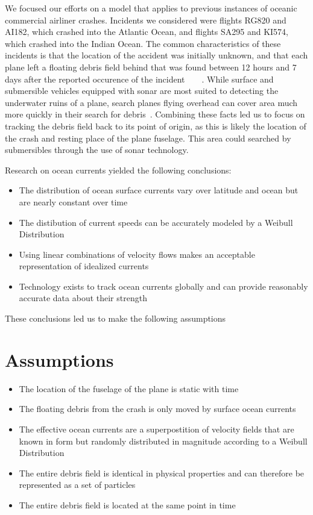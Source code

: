 \documentclass[pre,12pt]{revtex4-1}
\begin{document}
We focused our efforts on a model that applies to previous instances of oceanic commercial airliner crashes. Incidents we considered were flights RG820 and AI182, which crashed into the Atlantic Ocean, and flights SA295 and KI574, which crashed into the Indian Ocean. The common characteristics of these incidents is that the location of the accident was initially unknown, and that each plane left a floating debris field behind that was found between 12 hours and 7 days after the reported occurence of the incident~\cite{ASNtokyoRG820}~\cite{ASNmontrealAI182}~\cite{ASNtaipeiSA295}~\cite{ASNindonesiaKI574}. While surface and submersible vehicles equipped with sonar are most suited to detecting the underwater ruins of a plane, search planes flying overhead can cover area much more quickly in their search for debris~\cite{MetronAnalysis}. Combining these facts led us to focus on tracking the debris field back to its point of origin, as this is likely the location of the crash and resting place of the plane fuselage. This area could searched by submersibles through the use of sonar technology.

Research on ocean currents yielded the following conclusions:
\begin{itemize}
\item The distribution of ocean surface currents vary over latitude and ocean but are nearly constant over time~\cite{SurfaceCurrents}
\item The distibution of current speeds can be accurately modeled by a Weibull Distribution~\cite{DriftingObjects}
\item Using linear combinations of velocity flows makes an acceptable representation of idealized currents~\cite{OceDyn13}
\item Technology exists to track ocean currents globally and can provide reasonably accurate data about their strength~\cite{OceDyn12}
\end{itemize}
These conclusions led us to make the following assumptions

\section{Assumptions}\label{Assumptions}

\begin{itemize}
\item The location of the fuselage of the plane is static with time
\item The floating debris from the crash is only moved by surface ocean currents
\item The effective ocean currents are a superpostition of velocity fields that are known in form but randomly distributed in magnitude according to a Weibull Distribution
\item The entire debris field is identical in physical properties and can therefore be represented as a set of particles
\item The entire debris field is located at the same point in time
\end{itemize}
\end{document}
